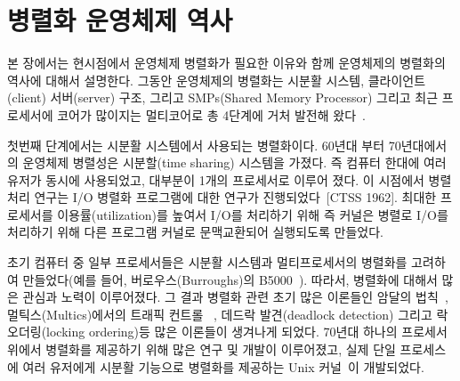\section{병렬화 운영체제 역사}





본 장에서는 현시점에서 운영체제 병렬화가 필요한 이유와 함께 운영체제의 병렬화의 역사에 대해서 설명한다.
그동안 운영체제의 병렬화는 시분활 시스템, 클라이언트(client) 서버(server) 구조, 그리고 SMPs(Shared Memory
Processor) 그리고 최근 프로세서에 코어가 많이지는 멀티코어로 총 4단계에 거처 발전해 왔다~\cite{Kaashoek2015PCO}.

첫번째 단계에서는 시분활 시스템에서 사용되는 병렬화이다. 
60년대 부터 70년대에서의 운영체제 병렬성은 시분할(time sharing) 시스템을 가졌다.
즉 컴퓨터 한대에 여러 유저가 동시에 사용되었고, 대부분이 1개의 프로세서로 이루어 졌다.
이 시점에서 병렬 처리 연구는 I/O 병렬화 프로그램에 대한 연구가 진행되었다~\cite{Bloch1959EDS}[CTSS 1962]. 
최대한 프로세서를 이용률(utilization)를 높여서 I/O를 처리하기 위해 즉 커널은
 병렬로 I/O를 처리하기 위해 다른 프로그램 커널로 문맥교환되어 실행되도록 만들었다.
 

초기 컴퓨터 중 일부 프로세서들은 시분활 시스템과 멀티프로세서의 병렬화를 고려하여
 만들었다(예를 들어, 버로우스(Burroughs)의 B5000~\cite{Mayer1982ABB}).
따라서, 병렬화에 대해서 많은 관심과 노력이 이루어졌다.
그 결과 병렬화 관련 초기 많은 이론들인 암달의 법칙~\cite{Amdahl1967VSP}, 멀틱스(Multics)에서의 트래픽 컨트롤
~\cite{Saltzer1966TCM}, 데드락 발견(deadlock detection) 그리고 락 오더링(locking ordering)등
많은 이론들이 생겨나게 되었다. 
70년대 하나의 프로세서 위에서 병렬화를 제공하기 위해 많은 연구 및 개발이 이루어졌고, 실제 
단일 프로세스에 여러 유저에게 시분활 기능으로
 병렬화를 제공하는 Unix 커널~\cite{Ritchie1973UTS}이 개발되었다.

